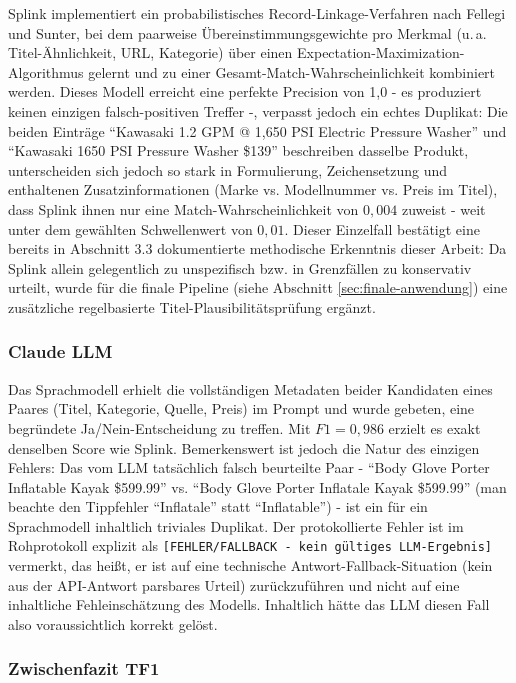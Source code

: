 Splink implementiert ein probabilistisches Record-Linkage-Verfahren nach
Fellegi und Sunter, bei dem paarweise Übereinstimmungsgewichte pro Merkmal
(u.\,a. Titel-Ähnlichkeit, URL, Kategorie) über einen Expectation-Maximization-Algorithmus
gelernt und zu einer Gesamt-Match-Wahrscheinlichkeit kombiniert werden. Dieses
Modell erreicht eine perfekte Precision von 1{,}0 - es produziert keinen
einzigen falsch-positiven Treffer -, verpasst jedoch ein echtes Duplikat: Die
beiden Einträge \enquote{Kawasaki 1.2 GPM @ 1,650 PSI Electric Pressure
Washer} und \enquote{Kawasaki 1650 PSI Pressure Washer \$139} beschreiben
dasselbe Produkt, unterscheiden sich jedoch so stark in Formulierung,
Zeichensetzung und enthaltenen Zusatzinformationen (Marke vs. Modellnummer vs.
Preis im Titel), dass Splink ihnen nur eine Match-Wahrscheinlichkeit von
$0{,}004$ zuweist - weit unter dem gewählten Schwellenwert von $0{,}01$. Dieser
Einzelfall bestätigt eine bereits in Abschnitt 3.3 dokumentierte methodische
Erkenntnis dieser Arbeit: Da Splink allein gelegentlich zu unspezifisch bzw.
in Grenzfällen zu konservativ urteilt, wurde für die finale Pipeline (siehe
Abschnitt \ref{sec:finale-anwendung}) eine zusätzliche regelbasierte
Titel-Plausibilitätsprüfung ergänzt.

\subsubsection{Claude LLM}

Das Sprachmodell erhielt die vollständigen Metadaten beider Kandidaten eines
Paares (Titel, Kategorie, Quelle, Preis) im Prompt und wurde gebeten, eine
begründete Ja/Nein-Entscheidung zu treffen. Mit $F1 = 0{,}986$ erzielt es exakt
denselben Score wie Splink. Bemerkenswert ist jedoch die Natur des einzigen
Fehlers: Das vom LLM tatsächlich falsch beurteilte Paar - \enquote{Body Glove
Porter Inflatable Kayak \$599.99} vs. \enquote{Body Glove Porter Inflatale
Kayak \$599.99} (man beachte den Tippfehler \enquote{Inflatale} statt
\enquote{Inflatable}) - ist ein für ein Sprachmodell inhaltlich triviales
Duplikat. Der protokollierte Fehler ist im Rohprotokoll explizit als
\texttt{[FEHLER/FALLBACK - kein gültiges LLM-Ergebnis]} vermerkt, das heißt,
er ist auf eine technische Antwort-Fallback-Situation (kein aus der
API-Antwort parsbares Urteil) zurückzuführen und nicht auf eine inhaltliche
Fehleinschätzung des Modells. Inhaltlich hätte das LLM diesen Fall also
voraussichtlich korrekt gelöst.

\subsubsection*{Zwischenfazit TF1}

